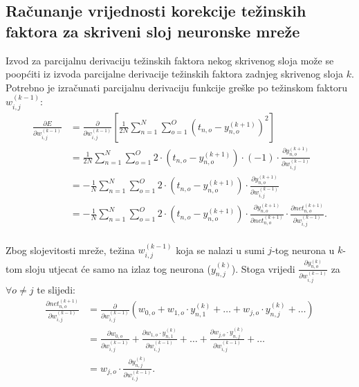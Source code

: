 \subsection{Računanje vrijednosti korekcije težinskih faktora za skriveni sloj neuronske mreže}
\label{subsec:racunanje-vrijednosti-korekcije-tezinskih-faktora-za-skriveni-sloj-neuronske-mreze}
Izvod za parcijalnu derivaciju težinskih faktora nekog skrivenog sloja može se poopćiti iz izvoda parcijalne derivacije
težinskih faktora zadnjeg skrivenog sloja $k$. Potrebno je izračunati parcijalnu derivaciju funkcije greške po težinskom
faktoru $w_{i, j}^{(k - 1)}$:\\
\begin{align}
    \frac{\partial E}{\partial w_{i, j}^{(k - 1)}} & = \frac{\partial}{\partial w_{i, j}^{(k - 1)}} \left[
    \frac{1}{2N} \sum_{n = 1}^{N} \sum_{o = 1}^{O} \left(t_{n, o} - y_{n, o}^{(k + 1)}\right)^2\right]\\
    & = \frac{1}{2N} \sum_{n = 1}^{N} \sum_{o = 1}^{O} 2 \cdot \left(t_{n, o} - y_{n, o}^{(k + 1)}\right) \cdot (-1)
    \cdot \frac{\partial y_{n, o}^{(k + 1)}}{\partial w_{i, j}^{(k - 1)}}\\
    & = -\frac{1}{N} \sum_{n = 1}^{N} \sum_{o = 1}^{O} 2 \cdot \left(t_{n, o} - y_{n, o}^{(k + 1)}\right) \cdot
    \frac{\partial y_{n, o}^{(k + 1)}}{\partial w_{i, j}^{(k - 1)}}\\
    & = -\frac{1}{N} \sum_{n = 1}^{N} \sum_{o = 1}^{O} 2 \cdot \left(t_{n, o} - y_{n, o}^{(k + 1)}\right) \cdot
    \frac{\partial y_{n, o}^{(k + 1)}}{\partial net_{n, o}^{(k + 1)}} \cdot
    \frac{\partial net_{n, o}^{(k + 1)}}{\partial w_{i, j}^{(k - 1)}}.\label{eq:error-partial-3}
\end{align}\\
Zbog slojevitosti mreže, težina $w_{i, j}^{(k - 1)}$ koja se nalazi u sumi $j$-tog neurona u $k$-tom sloju utjecat će
samo na izlaz tog neurona ($y_{n, j}^{(k)}$). Stoga vrijedi
$\frac{\partial y_{n, o}^{(k)}}{\partial w_{i, j}^{(k - 1)}}$ za $\forall o \neq j$ te slijedi:\\
\begin{align}
    \frac{\partial net_{n, o}^{(k + 1)}}{\partial w_{i, j}^{(k - 1)}} & = \frac{\partial}{\partial w_{i, j}^{(k - 1)}}
    \left(w_{0, o} + w_{1, o} \cdot y_{n, 1}^{(k)} + \dots + w_{j, o} \cdot y_{n, j}^{(k)} + \dots\right)\\
    & = \frac{\partial w_{0, o}}{\partial w_{i, j}^{(k - 1)}} +
    \frac{\partial w_{1, o} \cdot y_{n, 1}^{(k)}}{\partial w_{i, j}^{(k - 1)}} + \dots +
    \frac{\partial w_{j, o} \cdot y_{n, j}^{(k)}}{\partial w_{i, j}^{(k - 1)}} + \dots\\\
    & = w_{j, o} \cdot \frac{\partial y_{n, j}^{(k)}}{\partial w_{i, j}^{(k - 1)}}.\label{eq:net-partial-w}
\end{align}\\
